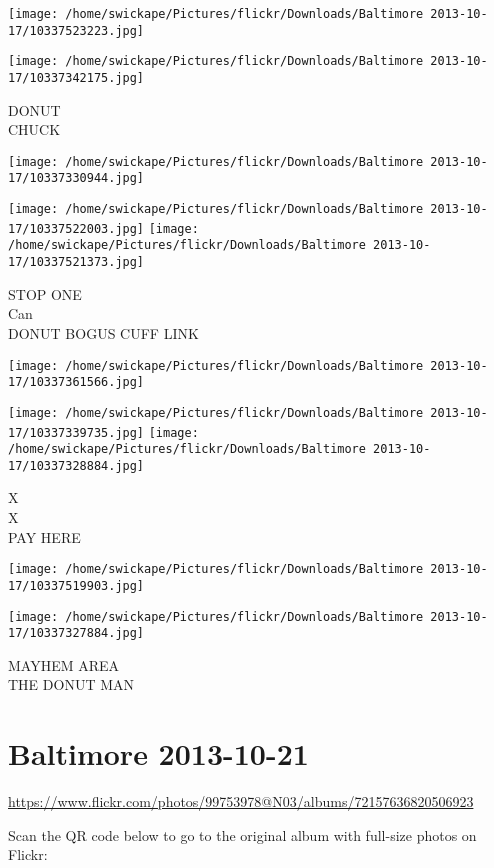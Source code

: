 \documentclass[10pt,letterpaper]{article}
\begin{document}
\texttt{[image: /home/swickape/Pictures/flickr/Downloads/Baltimore 2013-10-17/10337523223.jpg]}

\vspace{0.25in}
\texttt{[image: /home/swickape/Pictures/flickr/Downloads/Baltimore 2013-10-17/10337342175.jpg]}

DONUT\\
CHUCK
\pagebreak

\texttt{[image: /home/swickape/Pictures/flickr/Downloads/Baltimore 2013-10-17/10337330944.jpg]}

\vspace{0.25in}
\texttt{[image: /home/swickape/Pictures/flickr/Downloads/Baltimore 2013-10-17/10337522003.jpg]}
\texttt{[image: /home/swickape/Pictures/flickr/Downloads/Baltimore 2013-10-17/10337521373.jpg]}

STOP ONE\\
Can\\
DONUT BOGUS CUFF LINK
\pagebreak

\texttt{[image: /home/swickape/Pictures/flickr/Downloads/Baltimore 2013-10-17/10337361566.jpg]}

\vspace{0.25in}
\texttt{[image: /home/swickape/Pictures/flickr/Downloads/Baltimore 2013-10-17/10337339735.jpg]}
\texttt{[image: /home/swickape/Pictures/flickr/Downloads/Baltimore 2013-10-17/10337328884.jpg]}

X\\
X\\
PAY HERE
\pagebreak

\texttt{[image: /home/swickape/Pictures/flickr/Downloads/Baltimore 2013-10-17/10337519903.jpg]}

\vspace{0.25in}
\texttt{[image: /home/swickape/Pictures/flickr/Downloads/Baltimore 2013-10-17/10337327884.jpg]}

MAYHEM AREA\\
THE DONUT MAN
\pagebreak

\section*{Baltimore 2013-10-21}

\url{https://www.flickr.com/photos/99753978@N03/albums/72157636820506923}

Scan the QR code below to go to the original album with full-size photos on Flickr:
\end{document}
